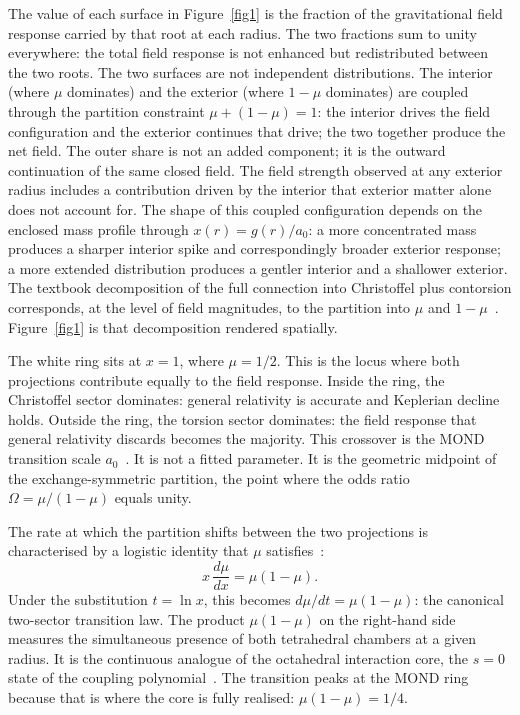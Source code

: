 \documentclass[twocolumn]{iopjournal}
\begin{document}
The value of each surface in Figure~\ref{fig1} is the
fraction of the gravitational field response carried by that
root at each radius.  The two fractions sum to unity
everywhere: the total field response is not enhanced but
redistributed between the two roots.  The two surfaces are
not independent distributions.  The interior (where $\mu$
dominates) and the exterior (where $1 - \mu$ dominates) are
coupled through the partition constraint
$\mu + (1{-}\mu) = 1$: the interior drives the field
configuration and the exterior continues that drive; the two
together produce the net field.  The outer
share is not an added component; it is the outward
continuation of the same closed field.  The field strength
observed at any exterior radius includes a contribution
driven by the interior that exterior matter alone does not
account for.  The shape of this coupled
configuration depends on the enclosed mass profile through
$x(r) = g(r)/a_0$: a more concentrated mass produces a
sharper interior spike and correspondingly broader exterior
response; a more extended distribution produces a gentler
interior and a shallower exterior.  The textbook
decomposition of the full connection into Christoffel plus
contorsion corresponds, at the level of field magnitudes, to
the partition into $\mu$ and
$1 - \mu$~\cite{Nelson2026b}.  Figure~\ref{fig1} is that
decomposition rendered spatially.

The white ring sits at $x = 1$, where $\mu = 1/2$.  This is
the locus where both projections contribute equally to the
field response.  Inside the ring, the Christoffel sector
dominates: general relativity is accurate and Keplerian
decline holds.  Outside the ring, the torsion sector
dominates: the field response that general relativity
discards becomes the majority.  This crossover is the MOND
transition scale $a_0$~\cite{Milgrom1983}.  It is not a
fitted parameter.  It is the geometric midpoint of the
exchange-symmetric partition, the point where the odds ratio
$\Omega = \mu/(1-\mu)$ equals unity.

The rate at which the partition shifts between the two
projections is characterised by a logistic identity that
$\mu$ satisfies~\cite{Nelson2026b}:
\begin{equation}
  x\,\frac{d\mu}{dx} = \mu(1 - \mu).
  \label{eq:logistic}
\end{equation}
Under the substitution $t = \ln x$, this becomes
$d\mu/dt = \mu(1-\mu)$: the canonical two-sector transition
law.  The product $\mu(1-\mu)$ on the right-hand side measures
the simultaneous presence of both tetrahedral chambers at a
given radius.  It is the continuous analogue of the octahedral
interaction core, the $s = 0$ state of the coupling
polynomial~\cite{Nelson2026b}.  The transition peaks at the
MOND ring because that is where the core is fully realised:
$\mu(1 - \mu) = 1/4$.
\end{document}
